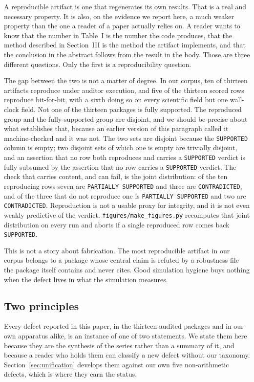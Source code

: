 \documentclass[sigconf,review]{acmart}
\begin{document}
A reproducible artifact is one that regenerates its own results. That is a
real and necessary property. It is also, on the evidence we report here, a
much weaker property than the one a reader of a paper actually relies on. A reader wants to know that the number in Table~I is the number the
code produces, that the method described in Section~III is the method the
artifact implements, and that the conclusion in the abstract follows from the
result in the body. Those are three different questions. Only the first is a
reproducibility question.

The gap between the two is not a matter of degree. In our corpus, ten of
thirteen artifacts reproduce under auditor execution, and five of the thirteen
scored rows reproduce bit-for-bit, with a sixth doing so on every scientific
field but one wall-clock field. Not one of the thirteen packages is fully
supported. The reproduced group and the fully-supported group are disjoint, and
we should be precise about what establishes that, because an earlier version
of this paragraph called it machine-checked and it was not. The two sets are
disjoint because the \texttt{SUPPORTED} column is empty; two disjoint sets of
which one is empty are trivially disjoint, and an assertion that no row both
reproduces and carries a \texttt{SUPPORTED} verdict is fully subsumed by the
assertion that no row carries a \texttt{SUPPORTED} verdict. The check that
carries content, and can fail, is the joint distribution: of the ten
reproducing rows seven are \texttt{PARTIALLY SUPPORTED} and three are
\texttt{CONTRADICTED}, and of the three that do not reproduce one is
\texttt{PARTIALLY SUPPORTED} and two are \texttt{CONTRADICTED}. Reproduction
is not a usable proxy for integrity, and it is not even weakly predictive of
the verdict. \texttt{figures/make\_figures.py} recomputes that joint
distribution on every run and aborts if a single reproduced row comes back
\texttt{SUPPORTED}.

This is not a story about fabrication. The most reproducible artifact in our
corpus belongs to a package whose central claim is refuted by a robustness
file the package itself contains and never cites. Good simulation hygiene buys
nothing when the defect lives in what the simulation measures.

\subsection{Two principles}
\label{sec:principles}

Every defect reported in this paper, in the thirteen audited packages and in
our own apparatus alike, is an instance of one of two statements. We state them
here because they are the synthesis of the series rather than a summary of it,
and because a reader who holds them can classify a new defect without our
taxonomy. Section~\ref{sec:unification} develops them against our own five
non-arithmetic defects, which is where they earn the status.
\end{document}
